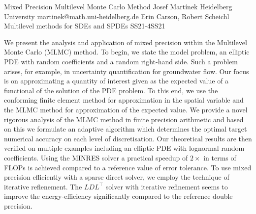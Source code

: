 \begin{talk}
  {Mixed Precision Multilevel Monte Carlo Method}%
  {Josef Martínek}%
  {Heidelberg University}%
  {martinek@math.uni-heidelberg.de}%
  {Erin Carson, Robert Scheichl}%
{Multilevel methods for SDEs and SPDEs}
{}{SS21-4}{SS21}

			
We present the analysis and application of mixed precision within the Multilevel Monte Carlo (MLMC) method. To begin, we state the model problem, an elliptic PDE with random coefficients and a random right-hand side. Such a problem arises, for example, in uncertainty quantification for groundwater flow. Our focus is on approximating a quantity of interest given as the expected value of a functional of the solution of the PDE problem. To this end, we use the conforming finite element method for approximation in the spatial variable and the MLMC method for approximation of the expected value. We provide a novel rigorous analysis of the MLMC method in finite precision arithmetic and based on this we formulate an adaptive algorithm which determines the optimal target numerical accuracy on each level of discretisation. Our theoretical results are then verified on multiple examples including an elliptic PDE with lognormal random coefficients. Using the MINRES solver a practical speedup of $2\times$ in terms of FLOPs is achieved compared to a reference value of error tolerance. To use mixed precision efficiently with a sparse direct solver, we employ the technique of iterative refienement. The $LDL^\top$ solver with iterative refinement seems to improve the energy-efficiency significantly compared to the reference double precision.

\end{talk}


